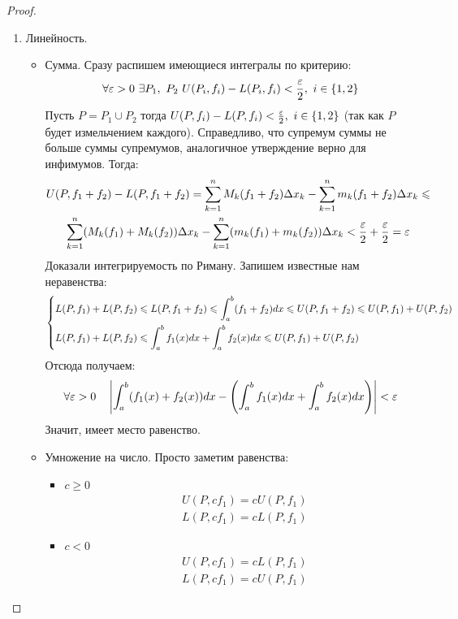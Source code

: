 \begin{proof}~
	\begin{enumerate}
		\item Линейность.
		\begin{itemize}
			\item Сумма. Сразу распишем имеющиеся интегралы по критерию:
			\[
			\forall \varepsilon > 0\ \exists P_1,\ P_2\ U(P_i, f_i) - L(P_i, f_i) < \frac{\varepsilon}{2},\ i \in \{1, 2\}
			\]
			Пусть $P = P_1 \cup P_2$ тогда $U(P, f_i) - L(P, f_i) < \frac{\varepsilon}{2},\ i \in \{1, 2\}$ (так как $P$ будет измельчением каждого).
			Справедливо, что супремум суммы не больше суммы супремумов, аналогичное утверждение верно для инфимумов. Тогда:
			\begin{multline*}
				U(P, f_1 + f_2) - L(P, f_1 + f_2) = \sum\limits_{k = 1}^nM_k(f_1 + f_2)\Delta x_k - \sum\limits_{k = 1}^nm_k(f_1 + f_2)\Delta x_k \leqslant
				\\
				\sum\limits_{k = 1}^n(M_k(f_1) + M_k(f_2))\Delta x_k - \sum\limits_{k = 1}^n(m_k(f_1) + m_k(f_2))\Delta x_k < \frac{\varepsilon}{2} + \frac{\varepsilon}{2} = \varepsilon
			\end{multline*}
			Доказали интегрируемость по Риману. Запишем известные нам неравенства:
			\[
			\left\{\begin{aligned}
				&{L(P, f_1) + L(P, f_2) \leqslant L(P, f_1 + f_2) \leqslant \int_{a}^{b}(f_1 + f_2)dx \leqslant U(P, f_1 + f_2) \leqslant U(P, f_1) + U(P, f_2)}
				\\
				&{L(P, f_1) + L(P, f_2) \leqslant \int_a^b f_1(x)dx + \int_a^b f_2(x)dx \leqslant U(P, f_1) + U(P, f_2)}
			\end{aligned}\right.
			\]
			Отсюда получаем:
			\[
			\forall \varepsilon > 0 \quad \left|\int_a^b(f_1(x) + f_2(x))dx - \left(\int_a^bf_1(x)dx + \int_a^bf_2(x)dx\right)\right| < \varepsilon
			\]
			Значит, имеет место равенство.
			
			\item Умножение на число. Просто заметим равенства:
			\begin{itemize}
				\item $c \geq 0$
				\begin{align*}
					& U(P, cf_1) = cU(P, f_1)
					\\
					& L(P, cf_1) = cL(P, f_1)
				\end{align*}
				\item $c < 0$
				\begin{align*}
					& U(P, cf_1) = cL(P, f_1)
					\\
					& L(P, cf_1) = cU(P, f_1)
				\end{align*}
			\end{itemize}
		\end{itemize}
		

\end{enumerate}
\end{proof}
